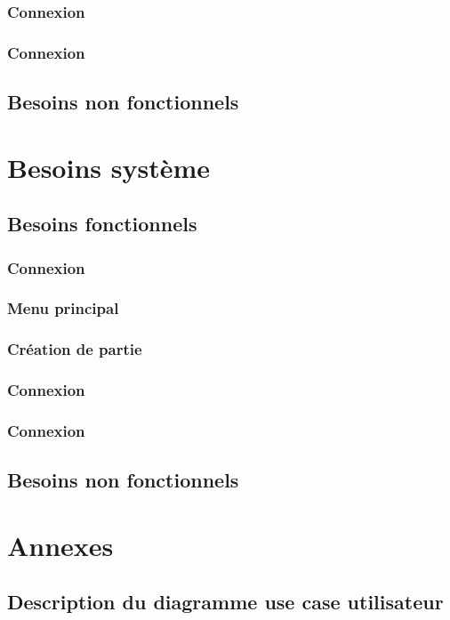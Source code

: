 \documentclass[utf8]{article}
\begin{document}
\subsubsection{Connexion}
\subsubsection{Connexion}
\subsection{Besoins non fonctionnels}

\section{Besoins système}
\subsection{Besoins fonctionnels}
\subsubsection{Connexion}
\subsubsection{Menu principal}
\subsubsection{Création de partie}
\subsubsection{Connexion}
\subsubsection{Connexion}
\subsection{Besoins non fonctionnels}

\newpage
 \section{Annexes}
\subsection{ Description du diagramme use case utilisateur}
\end{document}

